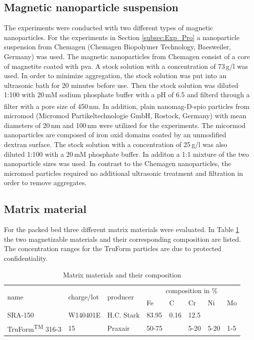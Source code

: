 \subsection{Magnetic nanoparticle suspension}
\label{subsec:Mag_nanoparticles}
The experiments were conducted with two different types of magnetic nanoparticles. For the experiments in Section \ref{subsec:Exp_Pro} a nanoparticle suspension from Chemagen (Chemagen Biopolymer Technology, Baesweiler, Germany) was used. The magnetic nanoparticles from Chemagen consist of a core of magnetite coated with \gls{pva}. A stock solution with a concentration of 73\,g/l was used. In order to minimize aggregation, the stock solution was put into an ultrasonic bath for 20 minutes before use. Then the stock solution was diluted 1:100 with 20\,mM sodium phosphate buffer with a pH of 6.5 and filterd through a filter with a pore size of 450\,nm. 
In addition,  plain nanomag\textsuperscript{\textregistered}-D-spio particles from micromod (Micromod Partikeltechnologie GmbH, Rostock, Germany) with mean diameters of 20\,nm and 100\,nm were utilized for the experiments. The micormod nanoparticles are composed of iron oxid domains coated by an unmodified dextran surface. The stock solution with a concentration of 25\,g/l was also diluted 1:100 with a 20\,mM phosphate buffer. In additon a 1:1 mixture of the two nanoparticle sizes was used. In contrast to the Chemagen nanoparticles, the micromod particles required no additional ultrasonic treatment and filtration in order to remove aggregates.     

\subsection{Matrix material}
\label{subsec:Matrix_mat}
For the packed bed three different matrix materials were evaluated. In Table \ref{table:mat_material} the two magnetizable materials and their corresponding composition are listed. The concentration ranges for the TruForm particles are due to protected confidentiality. %

\begin{table}[H]
\centering
\caption{Matrix materials and their composition}
\label{table:mat_material}
\begin{tabular}{llllllll}\hline
\multirow{2}{*}{name} & \multirow{2}{*}{charge/lot} & \multirow{2}{*}{producer} & \multicolumn{5}{c}{composition in \%}  \\
& & & Fe & C & Cr & Ni & Mo \\
\hline\hline
SRA-150 & W140401E & H.C. Stark & 83.95 & 0.16 & 12.5  & & \\
TruForm\textsuperscript{TM} 316-3 & 15 & Praxair & 50-75 & & 5-20 &5-20& 1-5\\
\hline
\end{tabular}
\end{table}


